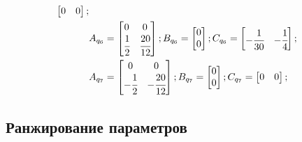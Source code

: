 \begin{align}
\begin{bmatrix}
	0 & 0
	\end{bmatrix};\\
	&A_{q_6} = 
	\begin{bmatrix}
	0 & 0\\
	\cfrac{1}{2} & \cfrac{20}{12}
	\end{bmatrix};
	B_{q_6} = 
	\begin{bmatrix}
	0\\
	0
	\end{bmatrix};
	C_{q_6} = 
	\begin{bmatrix}
	- \cfrac{1}{30} & - \cfrac{1}{4}
	\end{bmatrix};\\
	&A_{q_7} = 
	\begin{bmatrix}
	0 & 0\\
	- \cfrac{1}{2} & - \cfrac{20}{12}
	\end{bmatrix};
	B_{q_7} = 
	\begin{bmatrix}
	0\\
	0
	\end{bmatrix};
	C_{q_7} = 
	\begin{bmatrix}
	0 & 0
	\end{bmatrix};
\end{align}

\subsection{Ранжирование параметров}

